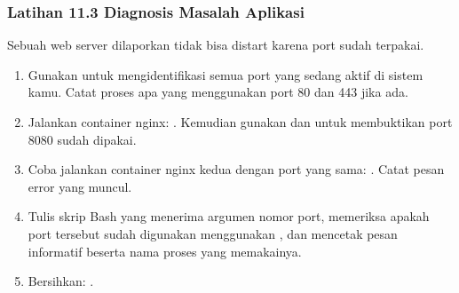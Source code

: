 \subsubsection*{Latihan 11.3 Diagnosis Masalah Aplikasi}
Sebuah web server dilaporkan tidak bisa distart karena port sudah terpakai.
\begin{enumerate}
    \item Gunakan  untuk mengidentifikasi semua port yang sedang
        aktif di sistem kamu. Catat proses apa yang menggunakan port 80 dan 443
        jika ada.
    \item Jalankan container nginx: . Kemudian gunakan  dan  untuk membuktikan port 8080 sudah dipakai.
    \item Coba jalankan container nginx kedua dengan port yang sama:
        .
        Catat pesan error yang muncul.
    \item Tulis skrip Bash  yang menerima argumen nomor port,
        memeriksa apakah port tersebut sudah digunakan menggunakan ,
        dan mencetak pesan informatif beserta nama proses yang memakainya.
\item Bersihkan: .
\end{enumerate}

